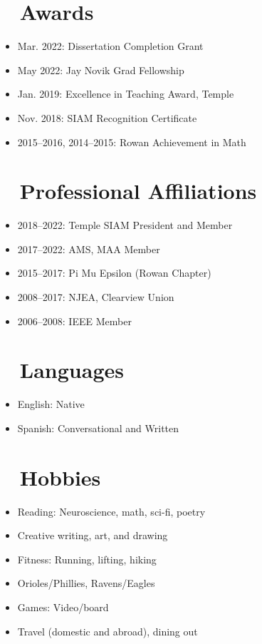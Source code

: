 \documentclass[10pt]{article}
\begin{document}
\section*{\faTrophy ~ Awards}
\begin{itemize}
    \item Mar. 2022: Dissertation Completion Grant
    \item May 2022: Jay Novik Grad Fellowship
    \item Jan. 2019: Excellence in Teaching Award, Temple
    \item Nov. 2018: SIAM Recognition Certificate
    \item 2015--2016, 2014--2015: Rowan Achievement in Math
\end{itemize}

\section*{\faUsers ~ Professional Affiliations}
\begin{itemize}
    \item 2018--2022: Temple SIAM President and Member
    \item 2017--2022: AMS, MAA Member
    \item 2015--2017: Pi Mu Epsilon (Rowan Chapter)
    \item 2008--2017: NJEA, Clearview Union
    \item 2006--2008: IEEE Member
\end{itemize}

\section*{\faLanguage ~ Languages}
\begin{itemize}
    \item English: Native
    \item Spanish: Conversational and Written
\end{itemize}

\section*{\faHeart ~ Hobbies}
\begin{itemize}
    \item Reading: Neuroscience, math, sci-fi, poetry
    \item Creative writing, art, and drawing
    \item Fitness: Running, lifting, hiking
    \item Orioles/Phillies, Ravens/Eagles
    \item Games: Video/board
    \item Travel (domestic and abroad), dining out
\end{itemize}
\end{document}
